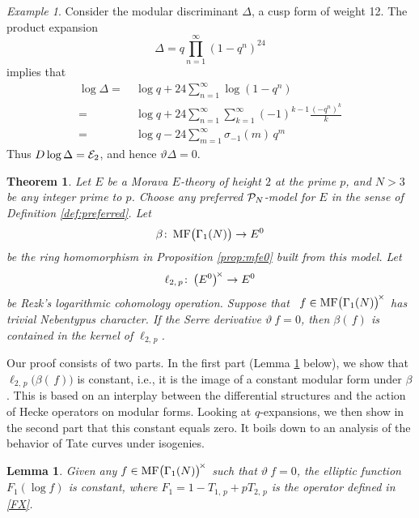 \documentclass{gtpart}
\newtheorem{thm}[equation]{Theorem}
\newtheorem{lem}[equation]{Lemma}
\theoremstyle{definition}
\theoremstyle{remark}
\newtheorem{ex}[equation]{Example}
\def\co{\colon\thinspace}
\newcommand{\CE}{{\cal E}}
\newcommand{\CP}{{\cal P}}
\newcommand{\MF}{{\rm MF}}
\newcommand{\B}{\beta}
\renewcommand{\D}{\Delta}
\newcommand{\G}{\Gamma}
\newcommand{\si}{\sigma}
\renewcommand{\=}{\approx}
\renewcommand{\-}{\sim}
\numberwithin{equation}{section}
\begin{document}
\begin{ex}
 \label{ex:D}
 Consider the modular discriminant $\D$, a cusp form of weight 12.  The product 
 expansion 
 \[
  \D = q \prod_{n=1}^\infty (1 - q^n)^{24} 
 \]
 implies that 
 \begin{equation}
  \label{logD}
  \begin{split}
   \log \D = & ~ \log q + 24 \sum_{n = 1}^\infty \log(1 - q^n) \\
           = & ~ \log q + 24 \sum_{n = 1}^\infty \sum_{k = 1}^\infty 
               (-1)^{k - 1} \frac{(-q^n)^k}{k} \\
           = & ~ \log q - 24 \sum_{m = 1}^\infty \si_{-1}(m) \, q^{m} 
  \end{split}
 \end{equation}
 Thus $D \log \D = \CE_2$, and hence $\vartheta \D = 0$.  
\end{ex}

\begin{thm}
 \label{thm:kerlog}
 Let $E$ be a Morava $E$-theory of height $2$ at the prime $p$, and $N > 3$ be 
 any integer prime to $p$.  Choose any preferred $\CP_N$-model for $E$ in the 
 sense of Definition \ref{def:preferred}.  Let 
 \[
  \B \co \MF\big(\G_1(N)\big) \to E^0 
 \]
 be the ring homomorphism in Proposition \ref{prop:mfe0} built from this model.  
 Let 
 \[
  \ell_{2,\,p} \co \big( E^0 \big)^{\!\times} \to E^0 
 \]
 be Rezk's logarithmic cohomology operation.  Suppose that \!\, 
 $f \in \MF\big(\G_1(N)\big)^{\!\times}$ has trivial Nebentypus character.  If 
 the Serre derivative $\vartheta ~\! f = 0$, then $\B(\,f)$ is contained in the 
 kernel of $\ell_{2,\,p}$.  
\end{thm}

Our proof consists of two parts.  In the first part (Lemma \ref{lem:const} 
below), we show that $\ell_{2,\,p}\big(\B(\,f)\big)$ is constant, i.e., it is 
the image of a constant modular form under $\B$.  This is based on an interplay 
between the differential structures and the action of Hecke operators on modular 
forms.  Looking at $q$-expansions, we then show in the second part that this 
constant equals zero.  It boils down to an analysis of the behavior of Tate 
curves under isogenies.  

\begin{lem}
 \label{lem:const}
 Given any $f \in \MF\big(\G_1(N)\big)^{\!\times}$ such that 
 $\vartheta ~\! f = 0$, the elliptic function $F_1(\log f)$ is constant, where 
 $F_1 = 1 - T_{1,\,p} + p T_{2,\,p}$ is the operator defined in \eqref{FX}.  
\end{lem}
\end{document}
